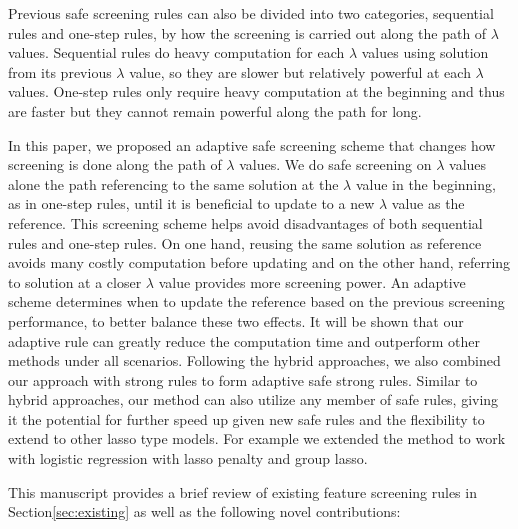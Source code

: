 \documentclass{article}
\begin{document}
Previous safe screening rules can also be divided into two categories, sequential rules and one-step rules, by how the screening is carried out along the path of $\lambda$ values. Sequential rules do heavy computation for each $\lambda$ values using solution from its previous $\lambda$ value, so they are slower but relatively powerful at each $\lambda$ values. One-step rules only require heavy computation at the beginning and thus are faster but they cannot remain powerful along the path for long. 

In this paper, we proposed an adaptive safe screening scheme that changes how screening is done along the path of $\lambda$ values. We do safe screening on $\lambda$ values alone the path referencing to the same solution at the $\lambda$ value in the beginning, as in one-step rules, until it is beneficial to update to a new $\lambda$ value as the reference. This screening scheme helps avoid disadvantages of both sequential rules and one-step rules. On one hand, reusing the same solution as reference avoids many costly computation before updating and on the other hand, referring to solution at a closer $\lambda$ value provides more screening power. An adaptive scheme determines when to update the reference based on the previous screening performance, to better balance these two effects. It will be shown that our adaptive rule can greatly reduce the computation time and outperform other methods under all scenarios. Following the hybrid approaches, we also combined our approach with strong rules to form adaptive safe strong rules. Similar to hybrid approaches, our method can also utilize any member of safe rules, giving it the potential for further speed up given new safe rules and the flexibility to extend to other lasso type models. For example we extended the method to work with logistic regression with lasso penalty and group lasso.

This manuscript provides a brief review of existing feature screening rules in Section\ref{sec:existing} as well as the following novel contributions:
\end{document}
